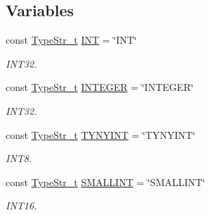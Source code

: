 \subsection*{Variables}
\begin{DoxyCompactItemize}
\item 
\mbox{\label{namespacesf_1_1sql__types_ab753c946fa3785eb0d73d8a6c07d093b}} 
const \hyperlink{namespacesf_1_1sql__types_a1a4f114cdf79706d2298e3454006e65b}{Type\+Str\+\_\+t} \hyperlink{namespacesf_1_1sql__types_ab753c946fa3785eb0d73d8a6c07d093b}{I\+NT} = \char`\"{}I\+NT\char`\"{}
\begin{DoxyCompactList}\small\item\em I\+N\+T32. \end{DoxyCompactList}\item 
\mbox{\label{namespacesf_1_1sql__types_a91673017e7f2cfaa0eac674693f354cd}} 
const \hyperlink{namespacesf_1_1sql__types_a1a4f114cdf79706d2298e3454006e65b}{Type\+Str\+\_\+t} \hyperlink{namespacesf_1_1sql__types_a91673017e7f2cfaa0eac674693f354cd}{I\+N\+T\+E\+G\+ER} = \char`\"{}I\+N\+T\+E\+G\+ER\char`\"{}
\begin{DoxyCompactList}\small\item\em I\+N\+T32. \end{DoxyCompactList}\item 
\mbox{\label{namespacesf_1_1sql__types_a148615f42881e13636e115b4a13aa20d}} 
const \hyperlink{namespacesf_1_1sql__types_a1a4f114cdf79706d2298e3454006e65b}{Type\+Str\+\_\+t} \hyperlink{namespacesf_1_1sql__types_a148615f42881e13636e115b4a13aa20d}{T\+Y\+N\+Y\+I\+NT} = \char`\"{}T\+Y\+N\+Y\+I\+NT\char`\"{}
\begin{DoxyCompactList}\small\item\em I\+N\+T8. \end{DoxyCompactList}\item 
\mbox{\label{namespacesf_1_1sql__types_a8d71db0159b103fb832e558db820e839}} 
const \hyperlink{namespacesf_1_1sql__types_a1a4f114cdf79706d2298e3454006e65b}{Type\+Str\+\_\+t} \hyperlink{namespacesf_1_1sql__types_a8d71db0159b103fb832e558db820e839}{S\+M\+A\+L\+L\+I\+NT} = \char`\"{}S\+M\+A\+L\+L\+I\+NT\char`\"{}
\begin{DoxyCompactList}\small\item\em I\+N\+T16. \end{DoxyCompactList}\item 

\end{DoxyCompactItemize}

